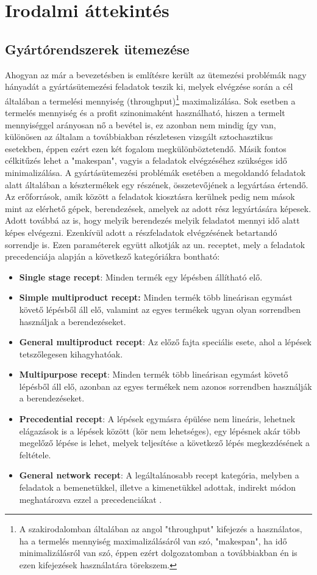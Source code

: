 \chapter{Irodalmi áttekintés} \label{Research}     
\section{Gyártórendszerek ütemezése}
Ahogyan az már a bevezetésben is említésre került az ütemezési problémák nagy hányadát a gyártásütemezési feladatok teszik ki, melyek elvégzése során a cél általában a termelési mennyiség (throughput)\footnote{A szakirodalomban általában az angol "throughput" kifejezés a használatos, ha a termelés mennyiség maximalizálásáról van szó, "makespan", ha idő minimalizálásról van szó, éppen ezért dolgozatomban a továbbiakban én is ezen kifejezések használatára törekszem.} maximalizálása.
Sok esetben a termelés mennyiség és a profit szinonimaként használható, hiszen a termelt mennyiséggel arányosan nő a bevétel is, ez azonban nem mindig így van, különösen az általam a továbbiakban részletesen vizsgált sztochasztikus esetekben, éppen ezért ezen két fogalom megkülönböztetendő.
Másik fontos célkitűzés lehet a "makespan", vagyis a feladatok elvégzéséhez szükséges idő minimalizálása.
A gyártásütemezési problémák esetében a megoldandó feladatok alatt általában a késztermékek egy részének, összetevőjének a legyártása értendő.
Az erőforrások, amik között a feladatok kiosztásra kerülnek pedig nem mások mint az elérhető gépek, berendezések, amelyek az adott rész legyártására képesek. 
Adott továbbá az is, hogy melyik berendezés melyik feladatot mennyi idő alatt képes elvégezni.
Ezenkívül adott a részfeladatok elvégzésének betartandó sorrendje is.
Ezen paraméterek együtt alkotják az un. receptet, mely a feladatok precedenciája alapján a következő kategóriákra bontható:
\begin{itemize}
\item[]\textbf{Single stage recept}: Minden termék egy lépésben állítható elő. 
\item[]\textbf{Simple multiproduct recept:} Minden termék több lineárisan egymást követő lépésből áll elő, valamint az egyes termékek ugyan olyan sorrendben használjak a berendezéseket.
\item[]\textbf{General multiproduct recept}: Az előző fajta speciális esete, ahol a lépések tetszőlegesen kihagyhatóak.
\item[]\textbf{Multipurpose recept}: Minden termék több lineárisan egymást követő lépésből áll elő, azonban az egyes termékek nem azonos sorrendben használják a berendezéseket.
\item[]\textbf{Precedential recept}: A lépések egymásra épülése nem lineáris, lehetnek elágazások is a lépések között (kör nem lehetséges), egy lépésnek akár több megelőző lépése is lehet, melyek teljesítése a következő lépés megkezdésének a feltétele.
\item[]\textbf{General network recept}: A legáltalánosabb recept kategória, melyben a feladatok a bemenetükkel, illetve a kimenetükkel adottak, indirekt módon meghatározva ezzel a precedenciákat \cite{hegyhati2010}.
\end{itemize}
